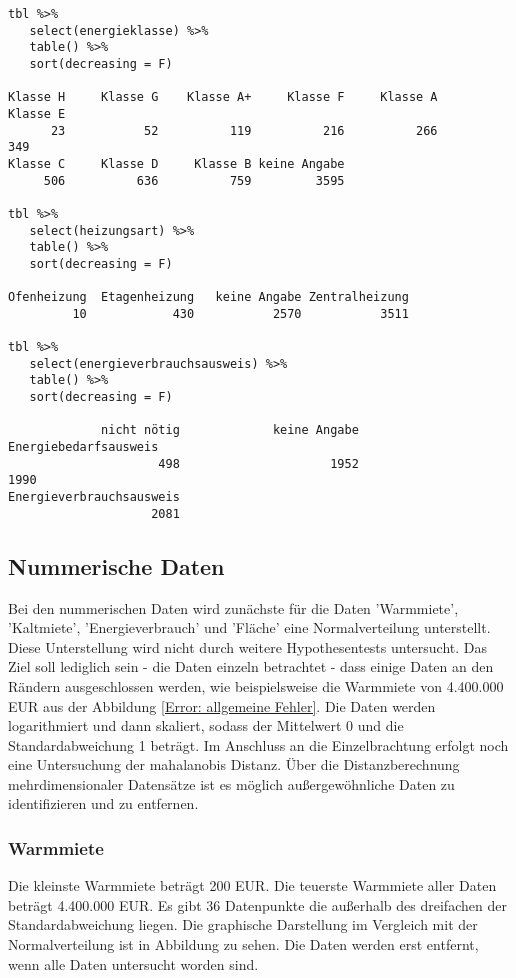 \begin{verbatim}
tbl %>% 
   select(energieklasse) %>%
   table() %>%
   sort(decreasing = F) 

Klasse H     Klasse G    Klasse A+     Klasse F     Klasse A     Klasse E 
      23           52          119          216          266          349 
Klasse C     Klasse D     Klasse B keine Angabe 
     506          636          759         3595 

tbl %>% 
   select(heizungsart) %>%
   table() %>%
   sort(decreasing = F) 

Ofenheizung  Etagenheizung   keine Angabe Zentralheizung 
         10            430           2570           3511 

tbl %>% 
   select(energieverbrauchsausweis) %>%
   table() %>%
   sort(decreasing = F) 

             nicht nötig             keine Angabe    Energiebedarfsausweis 
                     498                     1952                     1990 
Energieverbrauchsausweis 
                    2081 
\end{verbatim}


\subsection{Nummerische Daten}
Bei den nummerischen Daten wird zunächste für die Daten 'Warmmiete', 'Kaltmiete', 'Energieverbrauch' und 'Fläche' eine Normalverteilung unterstellt. Diese Unterstellung wird nicht durch weitere Hypothesentests untersucht. Das Ziel soll lediglich sein - die Daten einzeln betrachtet - dass einige Daten an den Rändern ausgeschlossen werden, wie beispielsweise die Warmmiete von 4.400.000 EUR aus der Abbildung \ref{Error: allgemeine Fehler}. Die Daten werden logarithmiert und dann skaliert, sodass der Mittelwert 0 und die Standardabweichung 1 beträgt. Im Anschluss an die Einzelbrachtung erfolgt noch eine Untersuchung der mahalanobis Distanz. Über die Distanzberechnung mehrdimensionaler Datensätze ist es möglich außergewöhnliche Daten zu identifizieren und zu entfernen. 

\subsubsection{Warmmiete}
Die kleinste Warmmiete beträgt 200 EUR. Die teuerste Warmmiete aller Daten beträgt 4.400.000 EUR. Es gibt 36 Datenpunkte die außerhalb des dreifachen der Standardabweichung liegen. Die graphische Darstellung im Vergleich mit der Normalverteilung ist in Abbildung \label{Ausreißer_vgl_warmmiete} zu sehen. Die Daten werden erst entfernt, wenn alle Daten untersucht worden sind.

